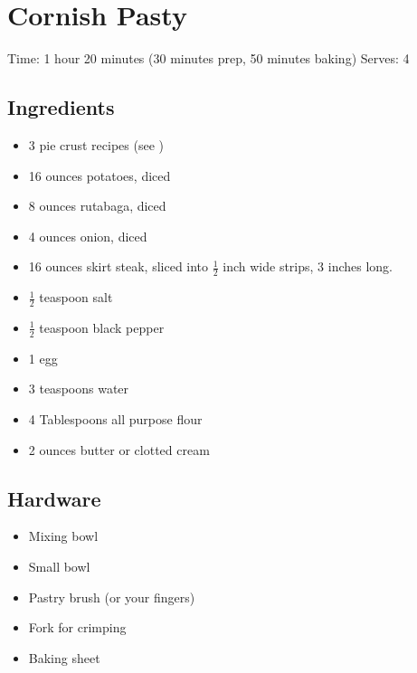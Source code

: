 \section{Cornish Pasty}
\label{cornishPasty}
\setcounter{secnumdepth}{0}
Time: 1 hour 20 minutes (30 minutes prep, 50 minutes baking)
Serves: 4

\begin{multicols}{2}
\subsection*{Ingredients}
\begin{itemize}
    \item 3 pie crust recipes (see )
    \item 16 ounces potatoes, diced
    \item 8 ounces rutabaga, diced
    \item 4 ounces onion, diced
    \item 16 ounces skirt steak, sliced into \( \frac{1}{2} \) inch wide strips, 3 inches long.
    \item \( \frac{1}{2} \) teaspoon salt
    \item \( \frac{1}{2} \) teaspoon black pepper
    \item 1 egg
    \item 3 teaspoons water
    \item 4 Tablespoons all purpose flour
    \item 2 ounces butter or clotted cream
\end{itemize}

\subsection*{Hardware}
\begin{itemize}
    \item Mixing bowl
    \item Small bowl
    \item Pastry brush (or your fingers)
    \item Fork for crimping
    \item Baking sheet
\end{itemize}
\clearpage


\end{multicols}
